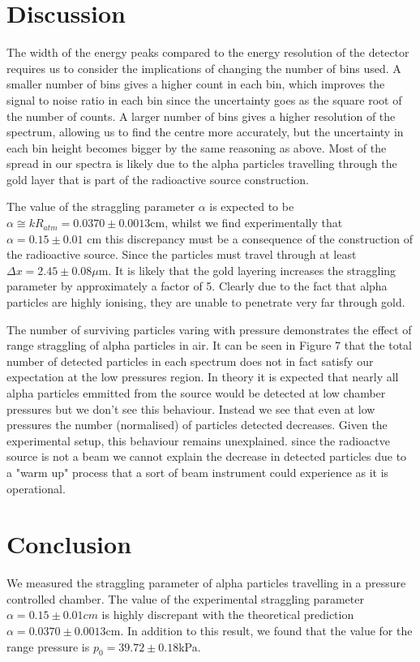 \documentclass[a4paper]{article}
\begin{document}
\begin{multicols}{2}
\section{Discussion}
The width of the energy peaks compared to the energy resolution of the detector requires us to consider the implications of changing the number of bins used. A smaller number of bins gives a higher count in each bin, which improves the signal to noise ratio in each bin since the uncertainty goes as the square root of the number of counts.
A larger number of bins gives a higher resolution of the spectrum, allowing us to find the centre more accurately, but the uncertainty in each bin height becomes bigger by the same reasoning as above\cite{feedback}.
Most of the spread in our spectra is likely due to the alpha particles travelling through the gold layer that is part of the radioactive source construction. 

The value of the straggling parameter $\alpha$ is expected to be $\alpha \cong k R_{atm} = 0.0370 \pm 0.0013$cm\cite{SPA}, whilst we find experimentally that $\alpha = 0.15 \pm 0.01$ cm this discrepancy must be a consequence of the construction of the radioactive source.
Since the particles must travel through at least $\Delta x = 2.45 \pm 0.08\mu$m. It is likely that the gold layering increases the straggling parameter by approximately a factor of 5. Clearly due to the fact that alpha particles are highly ionising, they are unable to penetrate very far through gold. 

The number of surviving particles varing with pressure demonstrates the effect of range straggling of alpha particles in air. It can be seen in Figure 7 that the total number of detected particles in each spectrum does not in fact satisfy our expectation at the low pressures region. In theory it is expected that nearly all alpha particles emmitted from the source would be detected at low chamber pressures but we don't see this behaviour. Instead we see that even at low pressures the number (normalised) of particles detected decreases.
Given the experimental setup, this behaviour remains unexplained. since the radioactve source is not a beam we cannot explain the decrease in detected particles due to a "warm up" process that a sort of beam instrument could experience as it is operational.


\section{Conclusion}
We measured the straggling parameter of alpha particles travelling in a pressure controlled chamber. The value of the experimental straggling parameter $\alpha = 0.15 \pm 0.01 cm$ is highly discrepant with the theoretical prediction $\alpha = 0.0370 \pm 0.0013$cm\cite{SPA}.
In addition to this result, we found that the value for the range pressure is $p_0 = 39.72 \pm 0.18$kPa.

\end{multicols}


\end{document}
